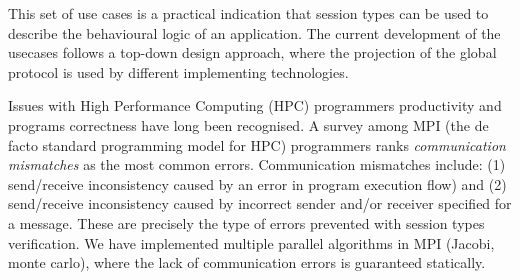 This set of use cases is a practical indication that session types can be used to describe the behavioural logic of an application. The current development of the usecases follows a top-down design approach, where the projection of the global protocol is used by different
implementing technologies.




Issues with High Performance Computing (HPC) programmers productivity and programs correctness have long been recognised. A survey among MPI (the de facto standard programming model for HPC) programmers \cite{MPIErrors} ranks \textit{communication mismatches} as the most common errors. Communication mismatches include: (1) send/receive inconsistency caused by an error in program execution flow) and (2) send/receive inconsistency caused by incorrect sender and/or receiver specified for a message. These are precisely the type of errors prevented with session types verification. We have implemented multiple parallel algorithms in MPI (Jacobi, monte carlo), where the lack of communication errors is guaranteed statically.    


